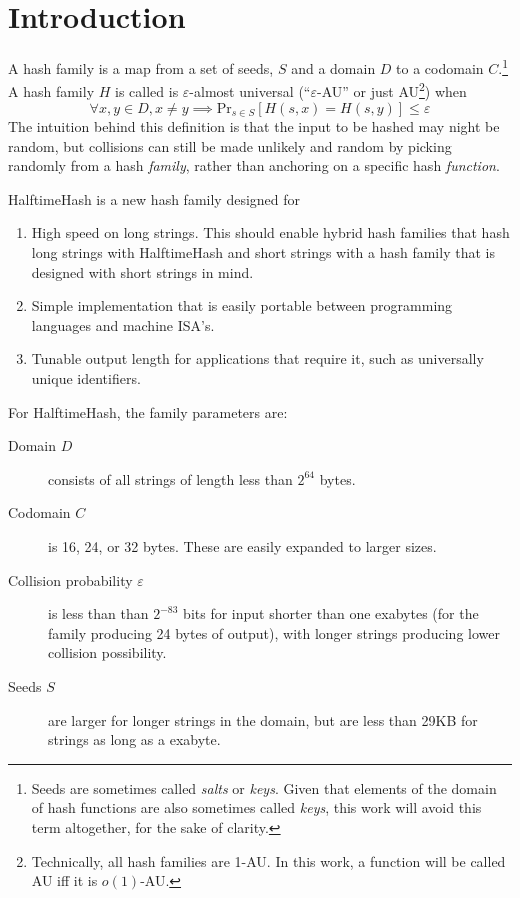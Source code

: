 \documentclass[sigconf, nonacm]{acmart}
\begin{document}
\section{Introduction}
A hash family is a map from a set of seeds, $S$ and a domain $D$ to a codomain $C$.\footnote{Seeds are sometimes called {\em salts} or {\em keys}. Given that elements of the domain of hash functions are also sometimes called {\em keys}, this work will avoid this term altogether, for the sake of clarity.}
A hash family $H$ is called is $\varepsilon$-almost universal (``$\varepsilon$-AU'' or just AU\footnote{Technically, all hash families are 1-AU. In this work, a function will be called AU iff it is $o(1)$-AU.}) when
\[\forall x,y \in D, x \neq y \implies \mathrm{Pr}_{s \in S}[H(s, x) = H(s, y)] \leq \varepsilon\]
The intuition behind this definition is that the input to be hashed may night be random, but collisions can still be made unlikely and random by picking randomly from a hash {\em family}, rather than anchoring on a specific hash {\em function}.

HalftimeHash is a new hash family designed for

\begin{enumerate}
\item High speed on long strings.
  This should enable hybrid hash families that hash long strings with HalftimeHash and short strings with a hash family that is designed with short strings in mind. \cite{siphash,umash}
\item Simple implementation that is easily portable between programming languages and machine ISA's.
\item Tunable output length for applications that require it, such as universally unique identifiers.
\end{enumerate}

For HalftimeHash, the family parameters are:

\begin{description}
\item[Domain $D$] consists of all strings of length less than $2^{64}$ bytes.
\item[Codomain $C$] is 16, 24, or 32 bytes.
  These are easily expanded to larger sizes.
\item[Collision probability $\varepsilon$] is less than than $2^{-83}$ bits for input shorter than one exabytes (for the family producing 24 bytes of output), with longer strings producing lower collision possibility.
\item[Seeds $S$] are larger for longer strings in the domain, but are less than 29KB for strings as long as a exabyte.
\end{description}
\end{document}
